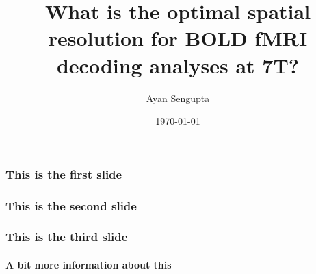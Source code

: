 \documentclass{beamer}
\title{What is the optimal spatial resolution for BOLD fMRI decoding analyses at 7T?}
\author{Ayan Sengupta\inst{1}}
\institute[Affiliations] %
{
  \inst{1}%
  Institute of Experimental Psychology\\
  Otto-von-Guericke University\\
  Magdeburg
}
\date{\today}
\begin{document}
\frame{\titlepage}
  \begin{frame}
    \frametitle{This is the first slide}
  \end{frame}
    \begin{frame}
        \frametitle{This is the second slide}
    \end{frame}
 
  \begin{frame}
    \frametitle{This is the third slide}
    \framesubtitle{A bit more information about this}
  \end{frame}
\end{document}
